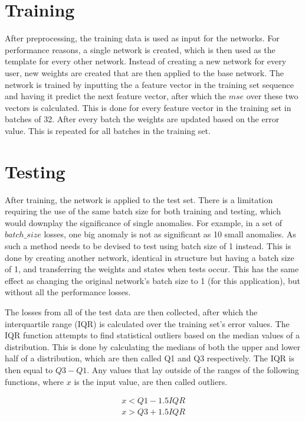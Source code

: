 \section{Training}
After preprocessing, the training data is used as input for the networks. For performance reasons, a single network is created, which is then used as the template for every other network. Instead of creating a new network for every user, new weights are created that are then applied to the base network. The network is trained by inputting the a feature vector in the training set sequence and having it predict the next feature vector, after which the \(mse\) over these two vectors is calculated. This is done for every feature vector in the training set in batches of 32. After every batch the weights are updated based on the error value. This is repeated for all batches in the training set.

\section{Testing}\label{sec:methods:testing}
After training, the network is applied to the test set. There is a limitation requiring the use of the same batch size for both training and testing, which would downplay the significance of single anomalies. For example, in a set of \(batch\_size\) losses, one big anomaly is not as significant as 10 small anomalies. As such a method needs to be devised to test using batch size of 1 instead. This is done by creating another network, identical in structure but having a batch size of 1, and transferring the weights and states when tests occur. This has the same effect as changing the original network's batch size to 1 (for this application), but without all the performance losses.

The losses from all of the test data are then collected, after which the interquartile range (IQR) is calculated over the training set's error values. The IQR function attempts to find statistical outliers based on the median values of a distribution. This is done by calculating the medians of both the upper and lower half of a distribution, which are then called Q1 and Q3 respectively. The IQR is then equal to \(Q3 - Q1\). Any values that lay outside of the ranges of the following functions, where \(x\) is the input value, are then called outliers.

\begin{subequations}
\begin{align}
	x < Q1 - 1.5 IQR \label{iqr_min} \\
	x > Q3 + 1.5 IQR \label{iqr_max}
\end{align}
\end{subequations}

